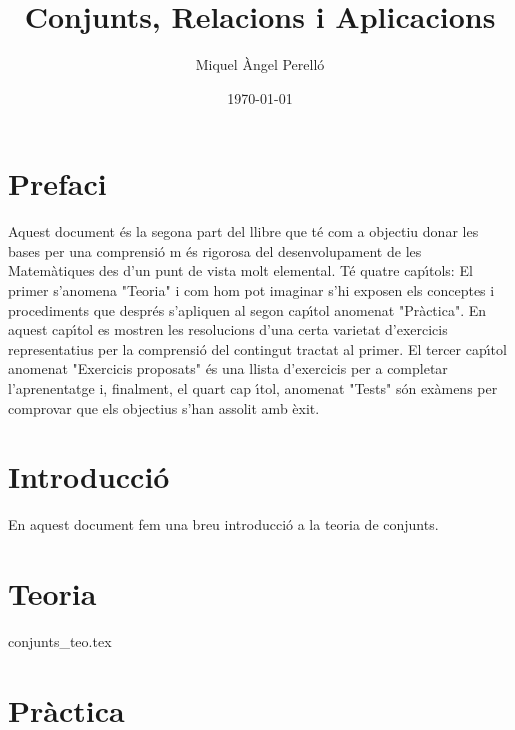 \documentclass[a4paper,12pt]{book}
\begin{document}
\pagecolor{fons!20}
\title{{\color{apren}\textbf{\huge{Conjunts, Relacions i Aplicacions}}}}
\author{Miquel Àngel Perelló}
\date{\today}

\let\cleardoublepage\clearpage
\maketitle
\tableofcontents

\frontmatter

\let\cleardoublepage\clearpage

\chapter*{Prefaci}

Aquest document \'{e}s la segona part del
llibre que t\'{e} com a objectiu donar les bases per una comprensi\'{o} m%
\'{e}s rigorosa del desenvolupament de les Matem\`{a}tiques des d'un punt de
vista molt elemental. T\'{e} quatre cap\'{\i}tols: El primer s'anomena
"Teoria" i com hom pot imaginar s'hi exposen els conceptes i procediments
que despr\'{e}s s'apliquen al segon cap\'{\i}tol anomenat "Pr\`{a}ctica". En
aquest cap\'{\i}tol es mostren les resolucions d'una certa varietat
d'exercicis representatius per la comprensi\'{o} del contingut tractat al
primer. El tercer cap\'{\i}tol anomenat "Exercicis proposats" \'{e}s una
llista d'exercicis per a completar l'aprenentatge i, finalment, el quart cap%
\'{\i}tol, anomenat "Tests" s\'{o}n ex\`{a}mens per comprovar que els
objectius s'han assolit amb \`{e}xit.

\let\cleardoublepage\clearpage

\chapter{Introducci\'{o}}

En aquest document fem una breu introducci\'{o} a la teoria de conjunts.

\let\cleardoublepage\clearpage

\mainmatter

\chapter{Teoria}

{conjunts_teo.tex}

\chapter{Pràctica}
\end{document}
